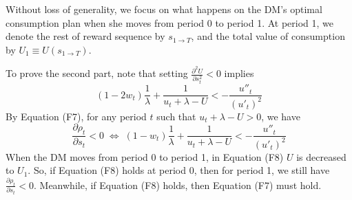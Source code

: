 Without loss of generality, we focus on what happens on the DM's optimal
consumption plan when she moves from period 0 to period 1. At period 1,
we denote the rest of reward sequence by \(s_{1 \rightarrow T}\), and
the total value of consumption by \(U_1\equiv U(s_{1\rightarrow T})\).

To prove the second part, note that setting
\(\frac{\partial^2 U}{\partial s_t^2}<0\) implies\[\tag{F7}
(1-2w_t)\frac{1}{\lambda} + \frac{1}{u_t+\lambda-U} < -\frac{u''_t}{(u'_t)^2} 
\]By Equation (F7), for any period \(t\) such that \(u_t+\lambda-U>0\),
we have\[\tag{F8}
\frac{\partial \rho_t}{\partial s_t}<0 \;\Longleftrightarrow\;
(1-w_t)\frac{1}{\lambda}+\frac{1}{u_t+\lambda-U}<-\frac{u''_t}{(u'_t)^2}
\]When the DM moves from period 0 to period 1, in Equation (F8) \(U\) is
decreased to \(U_1\). So, if Equation (F8) holds at period 0, then for
period 1, we still have \(\frac{\partial \rho_t}{\partial s_t}<0\).
Meanwhile, if Equation (F8) holds, then Equation (F7) must hold.
